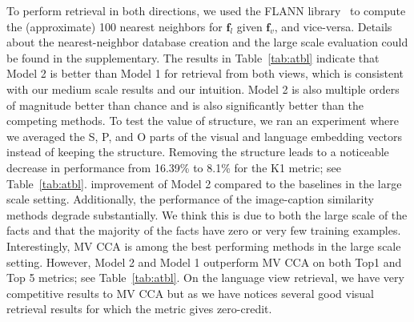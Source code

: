 \documentclass[runningheads]{llncs}
\begin{document}
To  perform retrieval in both directions, we used the FLANN library~\cite{muja2009flann}%
to compute the (approximate) 100 nearest neighbors for $\mathbf{f}_l$ given $\mathbf{f}_v$, and vice-versa.  Details about the nearest-neighbor database creation and the large scale evaluation could be found in the supplementary.
The results in Table~\ref{tab:atbl} indicate that Model 2 is better than Model 1 for retrieval from  both views, which is consistent with our medium scale results and our intuition. Model 2 is also multiple orders of magnitude better than chance and is also significantly better than the competing methods. To test the value of structure, we ran an experiment where we averaged the S, P, and O parts of the visual and language embedding vectors instead of keeping the structure.
Removing the structure leads to a noticeable decrease in performance from 16.39\% to 8.1\% for the K1 metric; see Table~\ref{tab:atbl}.
improvement of Model 2 compared to the baselines in the large scale setting. Additionally, the performance of the image-caption similarity methods degrade substantially. We think this is due to both the large scale of the facts and that the majority of the facts have zero or very few training examples. Interestingly, MV CCA is among the best performing methods in the large scale setting. However, Model 2 and Model 1 outperform MV CCA on both Top1 and Top 5 metrics; see Table~\ref{tab:atbl}. On the language view retrieval, we have very competitive results to MV CCA but as we have notices several good visual retrieval results for which the metric gives zero-credit.
\end{document}
